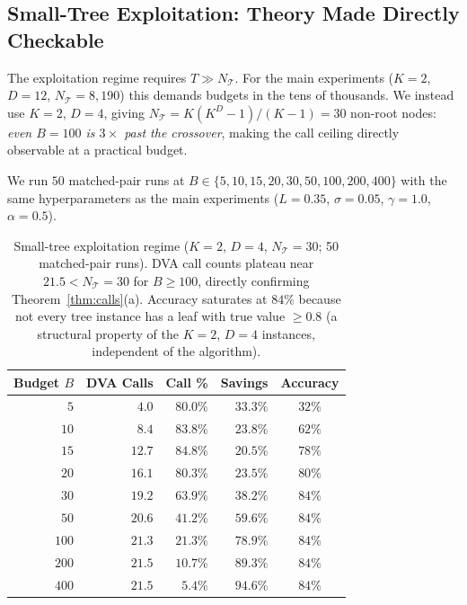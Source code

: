 \subsection{Small-Tree Exploitation: Theory Made Directly Checkable}
\label{sec:small_tree_results}

The exploitation regime requires $T \gg N_{\mathcal{T}}$.  For the main experiments
($K{=}2$, $D{=}12$, $N_{\mathcal{T}}{=}8{,}190$) this demands budgets in the tens of
thousands.  We instead use $K{=}2$, $D{=}4$, giving $N_{\mathcal{T}} = K(K^D-1)/(K-1) = 30$
non-root nodes: \emph{even $B{=}100$ is $3\times$ past the crossover}, making the
call ceiling directly observable at a practical budget.

We run $50$ matched-pair runs at $B \in \{5, 10, 15, 20, 30, 50, 100, 200, 400\}$
with the same hyperparameters as the main experiments ($L{=}0.35$, $\sigma{=}0.05$,
$\gamma{=}1.0$, $\alpha{=}0.5$).

\begin{table}[t]
\centering
\caption{Small-tree exploitation regime ($K{=}2$, $D{=}4$, $N_{\mathcal{T}}{=}30$;
  50 matched-pair runs).  DVA call counts plateau near $21.5 < N_{\mathcal{T}}{=}30$
  for $B \geq 100$, directly confirming Theorem~\ref{thm:calls}(a).  Accuracy
  saturates at $84\%$ because not every tree instance has a leaf with true
  value ${\geq}0.8$ (a structural property of the $K{=}2$, $D{=}4$ instances,
  independent of the algorithm).}
\label{tab:small_tree}
\begin{tabular}{rrrrc}
\toprule
Budget $B$ & DVA Calls & Call \% & Savings & Accuracy \\
\midrule
$5$   & $4.0$  & $80.0\%$ & $33.3\%$ & $32\%$ \\
$10$  & $8.4$  & $83.8\%$ & $23.8\%$ & $62\%$ \\
$15$  & $12.7$ & $84.8\%$ & $20.5\%$ & $78\%$ \\
$20$  & $16.1$ & $80.3\%$ & $23.5\%$ & $80\%$ \\
$30$  & $19.2$ & $63.9\%$ & $38.2\%$ & $84\%$ \\
$50$  & $20.6$ & $41.2\%$ & $59.6\%$ & $84\%$ \\
$100$ & $21.3$ & $21.3\%$ & $78.9\%$ & $84\%$ \\
$200$ & $21.5$ & $10.7\%$ & $89.3\%$ & $84\%$ \\
$400$ & $21.5$ & $ 5.4\%$ & $\mathbf{94.6\%}$ & $84\%$ \\
\bottomrule
\end{tabular}
\end{table}

